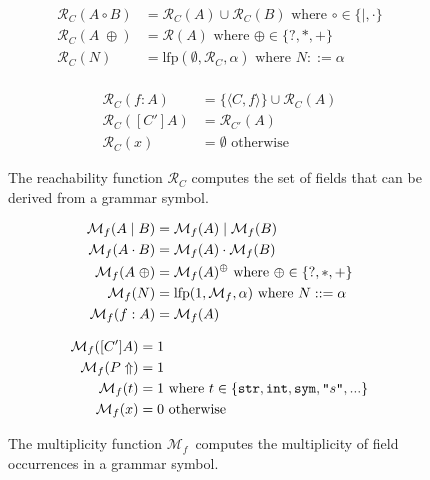 \documentclass[a4paper]{article}
\begin{document}
\def\fixpoint{\ensuremath{\text{lfp}}}
\def\reachability{\ensuremath{\mathcal{R}}}
\begin{figure}
\begin{minipage}[t]{0.5\textwidth}
\begin{align*}
\reachability_C(A \circ B) &= \reachability_C(A) \cup \reachability_C(B)
 \text{ where } \circ \in \{\mid, \cdot\}\\
\reachability_C(A\;\oplus) &= \reachability(A) \text{ where } \oplus \in \{?, *, +\}\\
\reachability_C(N) &= \fixpoint(\emptyset, \reachability_C, \alpha) \text{ where }N ::= \alpha\\
\end{align*}
\end{minipage}
\begin{minipage}[t]{0.5\textwidth}
\begin{align*}
\reachability_C(f: A) &= \{\langle C, f\rangle\} \cup \reachability_C(A)\\
\reachability_C([C'] A) &= \reachability_{C'}(A)\\
\reachability_C(x) &= \emptyset \text{ otherwise }
\end{align*}
\end{minipage}
\caption{The reachability function $\reachability_C$ computes the set
  of fields that can be derived from a grammar symbol.\label{FIG:reachability}}
\end{figure}


\def\mymultjoin{\ensuremath{\myjoin}}
\def\mymultmeet{\ensuremath{\mymeet}}
\def\mymultbottom{\ensuremath{1}}
\def\multof{\ensuremath{\mathcal{M}}}
\def\multoff{\ensuremath{\multof_f}}

\begin{figure}
\begin{minipage}[t]{0.5\textwidth}
\begin{align*}
\multoff(A\mid B) &= \multoff(A) \mymultjoin  \multoff(B)\\
\multoff(A\cdot B) &= \multoff(A) \mymultmeet  \multoff(B)\\
\multoff(A\;\oplus) &= \multoff(A)^\oplus \text{ where } \oplus\in \{?, *, +\}\\
\multoff(N) &= \fixpoint(\mymultbottom, \multoff, \alpha) \text{ where } N ::= \alpha\\
\multoff(f: A) &= \multoff(A)\\
\end{align*}
\end{minipage}
\begin{minipage}[t]{0.5\textwidth}
\begin{align*}
\multoff([C'] A) &= 1\\
\multoff(P\Uparrow) &= 1\\
\multoff(t) &= 1 \text{ where } t\in \{\text{\texttt{str}}, \text{\texttt{int}}, \text{\texttt{sym}}, \literal{s}, ...  \}\\
\multoff(x) &= 0 \text{ otherwise}
\end{align*}
\end{minipage}
\caption{The multiplicity function \multoff\ computes the multiplicity
  of field occurrences in a grammar symbol.\label{FIG:multiplicity}}
\end{figure}
\end{document}
